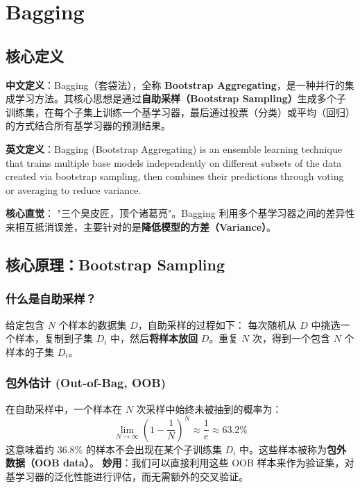 \documentclass[12pt, a4paper]{book}
\begin{document}
\tableofcontents
\newpage
\chapter{Bagging}


\section{核心定义}
\textbf{中文定义}：Bagging（套袋法），全称 \textbf{Bootstrap Aggregating}，是一种并行的集成学习方法。其核心思想是通过\textbf{自助采样（Bootstrap Sampling）}生成多个子训练集，在每个子集上训练一个基学习器，最后通过投票（分类）或平均（回归）的方式结合所有基学习器的预测结果。

\textbf{英文定义}：Bagging (Bootstrap Aggregating) is an ensemble learning technique that trains multiple base models independently on different subsets of the data created via bootstrap sampling, then combines their predictions through voting or averaging to reduce variance.

\textbf{核心直觉}：
"三个臭皮匠，顶个诸葛亮"。Bagging 利用多个基学习器之间的差异性来相互抵消误差，主要针对的是\textbf{降低模型的方差（Variance）}。

\section{核心原理：Bootstrap Sampling}

\subsection{什么是自助采样？}
给定包含 $N$ 个样本的数据集 $D$，自助采样的过程如下：
每次随机从 $D$ 中挑选一个样本，复制到子集 $D_i$ 中，然后\textbf{将样本放回} $D$。重复 $N$ 次，得到一个包含 $N$ 个样本的子集 $D_i$。

\subsection{包外估计 (Out-of-Bag, OOB)}
在自助采样中，一个样本在 $N$ 次采样中始终未被抽到的概率为：
$$ \lim_{N \to \infty} \left( 1 - \frac{1}{N} \right)^N \approx \frac{1}{e} \approx 63.2\% $$
这意味着约 $36.8\%$ 的样本不会出现在某个子训练集 $D_i$ 中。这些样本被称为\textbf{包外数据（OOB data）}。
\textbf{妙用}：我们可以直接利用这些 OOB 样本来作为验证集，对基学习器的泛化性能进行评估，而无需额外的交叉验证。
\end{document}
